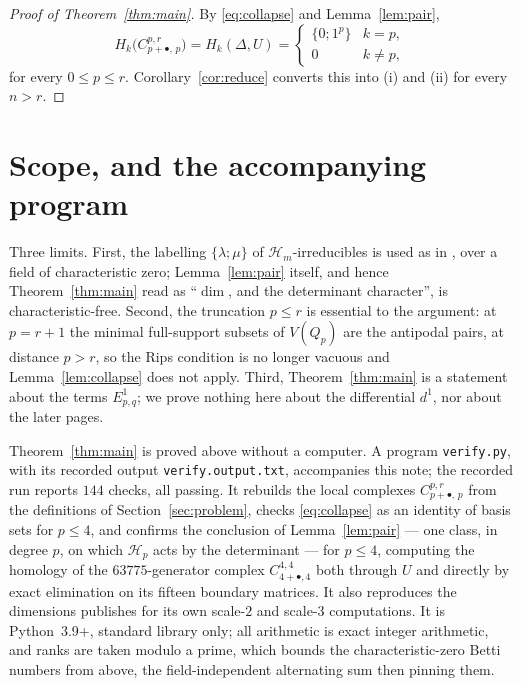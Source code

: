 \documentclass[11pt]{amsart}
\theoremstyle{definition}
\theoremstyle{remark}
\newcommand{\Hy}{\mathcal H}
\newcommand{\bl}{\bullet}
\numberwithin{equation}{section}
\begin{document}
\begin{proof}[Proof of Theorem~\ref{thm:main}]
By \eqref{eq:collapse} and Lemma~\ref{lem:pair},
\[
  H_k\bigl(C^{p,r}_{p+\bl,\,p}\bigr)=H_k(\Delta,U)=
  \begin{cases}\{0;1^p\}&k=p,\\ 0&k\neq p,\end{cases}
\]
for every $0\le p\le r$. Corollary~\ref{cor:reduce} converts this into (i)
and (ii) for every $n>r$.
\end{proof}

\section{Scope, and the accompanying program}\label{sec:scope}

Three limits. First, the labelling $\{\lambda;\mu\}$ of $\Hy_m$-irreducibles is
used as in \cite{GMW}, over a field of characteristic zero;
Lemma~\ref{lem:pair} itself, and hence Theorem~\ref{thm:main} read as
``$\dim$, and the determinant character'', is characteristic-free. Second, the
truncation $p\le r$ is essential to the argument: at $p=r+1$ the minimal
full-support subsets of $V(Q_p)$ are the antipodal pairs, at distance $p>r$, so
the Rips condition is no longer vacuous and Lemma~\ref{lem:collapse} does not
apply. Third, Theorem~\ref{thm:main} is a statement about the terms
$E^1_{p,q}$; we prove nothing here about the differential $d^1$, nor about the
later pages.

Theorem~\ref{thm:main} is proved above without a computer. A program
\texttt{verify.py}, with its recorded output \texttt{verify.output.txt},
accompanies this note; the recorded run reports $144$ checks, all passing. It
rebuilds the local complexes $C^{p,r}_{p+\bl,\,p}$ from the definitions of
Section~\ref{sec:problem}, checks \eqref{eq:collapse} as an identity of basis
sets for $p\le4$, and confirms the conclusion of Lemma~\ref{lem:pair} --- one
class, in degree $p$, on which $\Hy_p$ acts by the determinant --- for $p\le4$,
computing the homology of the $63775$-generator complex $C^{4,4}_{4+\bl,4}$
both through $U$ and directly by exact elimination on its fifteen boundary
matrices. It also reproduces the dimensions \cite{GMW} publishes for its own
scale-$2$ and scale-$3$ computations. It is Python~3.9+, standard library only;
all arithmetic is exact integer arithmetic, and ranks are taken modulo a prime,
which bounds the characteristic-zero Betti numbers from above, the
field-independent alternating sum then pinning them.
\end{document}

